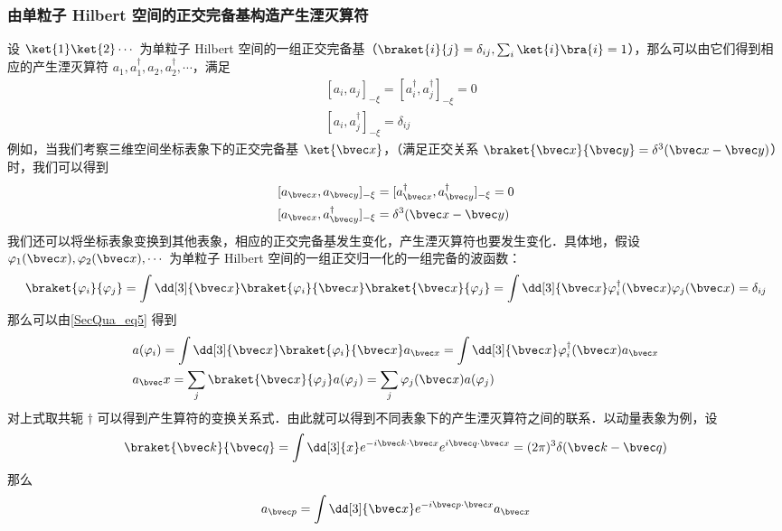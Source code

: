 \subsubsection{由单粒子 Hilbert 空间的正交完备基构造产生湮灭算符}
设 $\ket{1}\ket{2}\cdots$ 为单粒子 Hilbert 空间的一组正交完备基（$\braket{i}{j}=\delta_{ij},\sum_i\ket{i}\bra{i}=1$），那么可以由它们得到相应的产生湮灭算符 $a_1,a^\dagger_1,a_2,a^\dagger_2,\cdots$，满足
\begin{equation}
\begin{aligned}
&[a_i,a_j]_{-\xi}=[a_i^\dagger,a_j^\dagger]_{-\xi}=0\\
&[a_i,a_j^\dagger]_{-\xi}=\delta_{ij}
\end{aligned}
\end{equation}
例如，当我们考察三维空间坐标表象下的正交完备基 $\ket{\bvec x}$，（满足正交关系 $\braket{\bvec x}{\bvec y}=\delta^3(\bvec x-\bvec y)$）时，我们可以得到
\begin{equation}
\begin{aligned}
&[a_{\bvec x},a_{\bvec y}]_{-\xi}=[a_{\bvec x}^\dagger,a_{\bvec y}^\dagger]_{-\xi}=0\\
&[a_{\bvec x},a_{\bvec y}^\dagger]_{-\xi}=\delta^3(\bvec x-\bvec y)
\end{aligned}
\end{equation}
我们还可以将坐标表象变换到其他表象，相应的正交完备基发生变化，产生湮灭算符也要发生变化．具体地，假设 $\varphi_1(\bvec x),\varphi_2(\bvec x),\cdots$ 为单粒子 Hilbert 空间的一组正交归一化的一组完备的波函数：
\begin{equation}
\braket{\varphi_i}{\varphi_j}=\int \dd[3]{\bvec x}\braket{\varphi_i}{\bvec x}\braket{\bvec x}{\varphi_j}=\int \dd[3]{\bvec x} \varphi_i^\dagger(\bvec x)\varphi_j(\bvec x) =\delta_{ij} 
\end{equation}
那么可以由\autoref{SecQua_eq5} 得到
\begin{equation}
\begin{aligned}
&a(\varphi_i) = \int \dd[3]{\bvec x} \braket{\varphi_i}{\bvec x} a_{\bvec x}=\int \dd[3]{\bvec x} \varphi_i^\dagger(\bvec x) a_{\bvec x}\\
&a_\bvec x = \sum_j \braket{\bvec x}{\varphi_j} a(\varphi_j) = \sum_j \varphi_j(\bvec x)a(\varphi_j)
\end{aligned}
\end{equation}
对上式取共轭 $\dagger$ 可以得到产生算符的变换关系式．由此就可以得到不同表象下的产生湮灭算符之间的联系．以动量表象为例，设
\begin{equation}
\braket{\bvec k}{\bvec q}=\int \dd[3]{x} e^{-i\bvec k\cdot \bvec x} e^{i\bvec q\cdot \bvec x} = (2\pi)^3 \delta(\bvec k-\bvec q)
\end{equation}
那么
\begin{equation}
a_{\bvec p}=\int \dd[3]{\bvec x} e^{-i\bvec p\cdot \bvec x} a_{\bvec x}
\end{equation}

